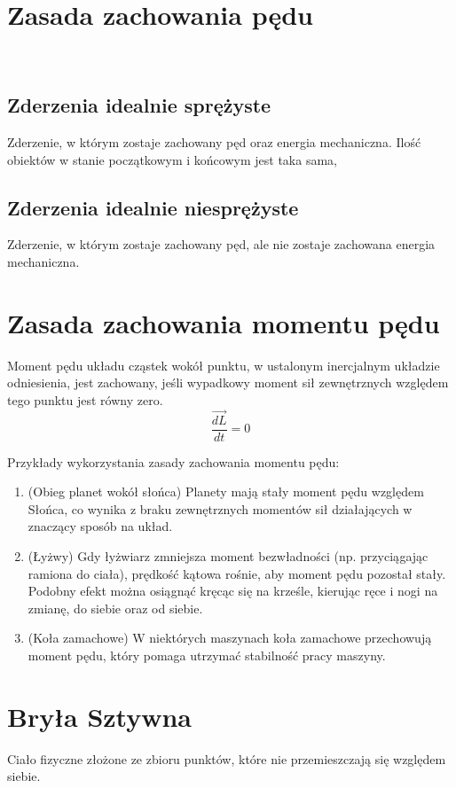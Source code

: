 \documentclass{article}
\theoremstyle{definition}
\theoremstyle{definition}
\theoremstyle{definition}
\theoremstyle{definition}
\begin{document}
\section{Zasada zachowania pędu}

\

\subsection{Zderzenia idealnie sprężyste}

Zderzenie, w którym zostaje zachowany pęd oraz energia mechaniczna. Ilość obiektów w stanie początkowym i końcowym jest taka sama,

\subsection{Zderzenia idealnie niesprężyste}

Zderzenie, w którym zostaje zachowany pęd, ale nie zostaje zachowana energia mechaniczna.

\section{Zasada zachowania momentu pędu}
Moment pędu układu cząstek wokół punktu, w ustalonym inercjalnym układzie odniesienia, jest zachowany, jeśli wypadkowy moment sił zewnętrznych względem tego punktu jest równy zero.
\[
\boxed{
\frac{\vec{dL}}{dt} = 0
}\]

Przykłady wykorzystania zasady zachowania momentu pędu:
\begin{enumerate}
    \item (Obieg planet wokół słońca) Planety mają stały moment pędu względem Słońca, co wynika z braku zewnętrznych momentów sił działających w znaczący sposób na układ.
    \item (Łyżwy) Gdy łyżwiarz zmniejsza moment bezwładności (np. przyciągając ramiona do ciała), prędkość kątowa rośnie, aby moment pędu pozostał stały. Podobny efekt można osiągnąć kręcąc się na krześle, kierując ręce i nogi na zmianę, do siebie oraz od siebie.
    \item (Koła zamachowe) W niektórych maszynach koła zamachowe przechowują moment pędu, który pomaga utrzymać stabilność pracy maszyny.
\end{enumerate}

\section{Bryła Sztywna}
Ciało fizyczne złożone ze zbioru punktów, które nie przemieszczają się względem siebie. 
\end{document}
